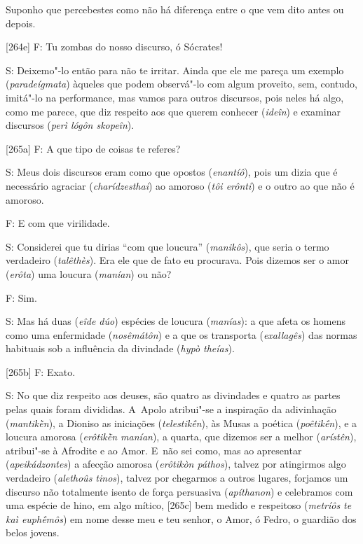  

Suponho que percebestes como não há diferença entre o que vem dito antes
ou depois.

 

[264e] F: Tu zombas do nosso discurso, ó Sócrates!

 

S: Deixemo"-lo então para não te irritar. Ainda que ele me pareça um
exemplo (\emph{paradeígmata}) àqueles que podem observá"-lo com algum
proveito, sem, contudo, imitá"-lo na performance, mas vamos para outros
discursos, pois neles há algo, como me parece, que diz respeito aos que
querem conhecer (\emph{ideîn}) e examinar discursos (\emph{perì lógôn
skopeîn}).

 

[265a] F: A que tipo de coisas te referes?

 

S: Meus dois discursos eram como que opostos (\emph{enantíô}), pois um
dizia que é necessário agraciar (\emph{charídzesthai}) ao amoroso
(\emph{tôi erônti}) e o outro ao que não é amoroso.

 

F: E com que virilidade.

 

S: Considerei que tu dirias ``com que loucura'' (\emph{manikôs}), que
seria o termo verdadeiro (\emph{talêthès}). Era ele que de fato eu
procurava. Pois dizemos ser o amor (\emph{erôta}) uma loucura
(\emph{manían}) ou não?

 

F: Sim.

 

S: Mas há duas (\emph{eîde dúo}) espécies de loucura (\emph{manías}): a
que afeta os homens como uma enfermidade (\emph{nosêmátôn}) e a que os
transporta (\emph{exallagês}) das normas habituais sob a influência da
divindade (\emph{hypò theías}).

 

[265b] F: Exato.

 

S: No que diz respeito aos deuses, são quatro as divindades e quatro as
partes pelas quais foram divididas. A~Apolo atribui"-se a inspiração da
adivinhação (\emph{mantikḕn}), a Dioniso as iniciações
(\emph{telestikḗn}), às Musas a poética (\emph{poêtikḗn}), e a loucura
amorosa (\emph{erôtikḕn manían}), a quarta, que dizemos ser a melhor
(\emph{arístên}), atribui"-se à Afrodite e ao Amor. E~não sei como, mas
ao apresentar (\emph{apeikádzontes}) a afecção amorosa (\emph{erôtikòn
páthos}), talvez por atingirmos algo verdadeiro (\emph{alethoûs tinos}),
talvez por chegarmos a outros lugares, forjamos um discurso não
totalmente isento de força persuasiva (\emph{apíthanon}) e celebramos
com uma espécie de hino, em algo mítico, [265c] bem medido e
respeitoso (\emph{metríôs te kaì euphḗmôs}) em nome desse meu e teu
senhor, o Amor, ó Fedro, o guardião dos belos jovens.

